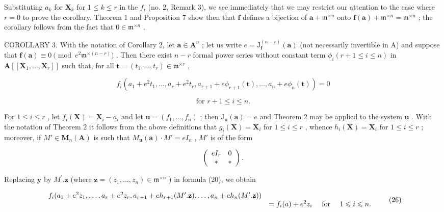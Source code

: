 Substituting \(a_k\) for \(\mathbf{X}_k\) for \(1 \leqslant k \leqslant r\) in the \(f_i\) (no. 2, Remark 3), we see immediately that we may restrict our attention to the case where \(r = 0\) to prove the corollary. Theorem 1 and Proposition 7 show then that \(\mathbf{f}\) defines a bijection of \(\mathbf{a} + \mathfrak{m}^{\times n}\) onto \(\mathbf{f}(\mathbf{a}) + \mathfrak{m}^{\times n} = \mathfrak{m}^{\times n}\) ; the corollary follows from the fact that \(0 \in \mathfrak{m}^{\times n}\) .

COROLLARY 3. With the notation of Corollary 2, let \(\mathbf{a} \in \mathbf{A}^n\) ; let us write \(e = \mathrm{J}_{\mathbf{f}}^{(n-r)}(\mathbf{a})\) (not necessarily invertible in A) and suppose that \(\mathbf{f}(\mathbf{a}) \equiv 0 \pmod{e^2\mathfrak{m}^{\times(n-r)}}\) . Then there exist \(n - r\) formal power series without constant term \(\phi_i (r + 1 \leqslant i \leqslant n)\) in \(\mathbf{A}[[\mathbf{X}_1, \ldots, \mathbf{X}_r]]\) such that, for all \(\mathbf{t} = (t_1, \ldots, t_r) \in \mathfrak{m}^{\times r}\) ,

\[
f _ {i} \left(a _ {1} + e ^ {2} t _ {1}, \dots , a _ {r} + e ^ {2} t _ {r}, a _ {r + 1} + e \phi_ {r + 1} (\mathbf {t}), \dots , a _ {n} + e \phi_ {n} (\mathbf {t})\right) = 0
\]

\[
\text{for } r + 1 \leqslant i \leqslant n.
\]

For \(1 \leqslant i \leqslant r\) , let \(f_{i}(\mathbf{X}) = \mathbf{X}_{i} - a_{i}\) and let \(\mathbf{u} = (f_{1}, \ldots, f_{n})\) ; then \(\mathrm{J}_{\mathbf{u}}(\mathbf{a}) = e\) and Theorem 2 may be applied to the system \(\mathbf{u}\) . With the notation of Theorem 2 it follows from the above definitions that \(g_{i}(\mathbf{X}) = \mathbf{X}_{i}\) for \(1 \leqslant i \leqslant r\) , whence \(h_{i}(\mathbf{X}) = \mathbf{X}_{i}\) for \(1 \leqslant i \leqslant r\) ; moreover, if \(M' \in \mathbf{M}_{n}(\mathbf{A})\) is such that \(M_{\mathbf{u}}(\mathbf{a}) \cdot M' = eI_{n}\) , \(M'\) is of the form

\[
\left( \begin{array}{c c} e I _ {r} & 0 \\ * & * \end{array} \right).
\]

Replacing \(\mathbf{y}\) by \(M^{\prime}.\mathbf{z}\) (where \(\mathbf{z} = (z_{1},\ldots ,z_{n})\in \mathfrak{m}^{\times n}\) ) in formula (20), we obtain

\[
\begin{array}{r l} f _ {i} (a _ {1} + e ^ {2} z _ {1}, \dots , a _ {r} + e ^ {2} z _ {r}, a _ {r + 1} + e h _ {r + 1} (M ^ {\prime}. \mathbf {z}), \dots , a _ {n} + e h _ {n} (M ^ {\prime}. \mathbf {z})) \\ & = f _ {i} (a) + e ^ {2} z _ {i} \quad \text { for } \quad 1 \leqslant i \leqslant n. \end{array}\tag{26}
\]

